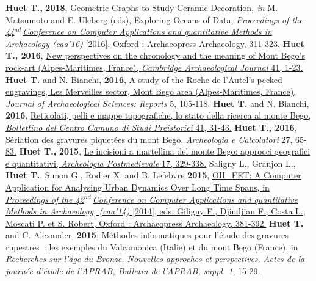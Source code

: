 \documentclass[11pt]{report} %
\begin{document}
\smallbreak
\textbf{Huet T.,} \textbf{2018}, \href{http://archaeopress.com/ArchaeopressShop/Public/displayProductDetail.asp?id=\%7B2724F16C-FAC1-4987-8D1E-E85D9F94ACAD\%7D}{Geometric Graphs to Study Ceramic Decoration\textit{, in} M. Matsumoto and  E. Uleberg (eds), Exploring Oceans of Data, \textit{Proceedings of the 44${}^{nd\ }$Conference on Computer Applications and quantitative Methods in Archaeology (caa'16) }[2016], Oxford : Archaeopress Archaeology, 311-323.}
\smallbreak
\textbf{Huet T., 2016}, \href{https://www.cambridge.org/core/journals/cambridge-archaeological-journal/article/new-perspectives-on-the-chronology-and-meaning-of-mont-bego-rock-art-alpesmaritimes-france/C5FB5BC57930F79DA17CB6F2CDE60C82}{New perspectives on the chronology and the meaning of Mont Bego's rock-art (Alpes-Maritimes, France), \textit{Cambridge Archaeological Journal} 41, 1-23.}
\smallbreak
\textbf{Huet T.} and N. Bianchi, \textbf{2016}, \href{https://www.sciencedirect.com/science/article/abs/pii/S2352409X15301760}{A study of the Roche de l'Autel's pecked engravings, Les Merveilles sector, Mont Bego area (Alpes-Maritimes, France), \textit{Journal of Archaeological Sciences: Reports} 5, 105-118.}
\smallbreak
\textbf{Huet T.} and N. Bianchi, \textbf{2016}, \href{http://www.ccsp.it/web/infoccsp/bcsp/bcsp41_preview.pdf}{Reticolati, pelli e mappe topografiche, lo stato della ricerca al monte Bego, \textit{Bollettino del Centro Camuno di Studi Preistorici} 41, 31-43.}
\smallbreak
\textbf{Huet T., 2016}, \href{https://dialnet.unirioja.es/servlet/articulo?codigo=6028872}{S\'{e}riation des gravures piquet\'{e}es du mont Bego, \textit{Archeologia e Calcolatori} 27, 65-83.}
\smallbreak
\textbf{Huet T.,} \textbf{2015}, \href{https://www.insegnadelgiglio.it/wp-content/uploads/2015/01/APM_17_libro-anteprima.pdf}{Le incisioni a martellina del monte Bego: approcci geografici e quantitativi, \textit{Archeologia Postmedievale} 17, 329-338.}
\smallbreak
Saligny L., Granjon L., \textbf{Huet T.}, Simon G., Rodier X. and B. Lefebvre \textbf{2015}, \href{https://hal.archives-ouvertes.fr/halshs-01146871}{OH\_FET: A Computer Application for Analysing Urban Dynamics Over Long Time Spans, in\textit{ Proceedings of the 42${}^{nd\ }$Conference on Computer Applications and quantitative Methods in Archaeology, (caa'14) }[2014], eds\textit{. }Giligny F., Djindjian F., Costa L., Moscati P. et S. Robert, Oxford : Archaeopress Archaeology, 381-392.}
\smallbreak
\textbf{Huet T.} and C. Alexander, \textbf{2015}, M\'{e}thodes informatiques pour l'\'{e}tude des gravures rupestres~: les exemples du Valcamonica (Italie) et du mont Bego (France), in \textit{Recherches sur l'\^{a}ge du Bronze. Nouvelles approches et perspectives. Actes de la journ\'{e}e d'\'{e}tude de l'APRAB, Bulletin de l'APRAB, suppl. 1}, 15-29.
\end{document}
